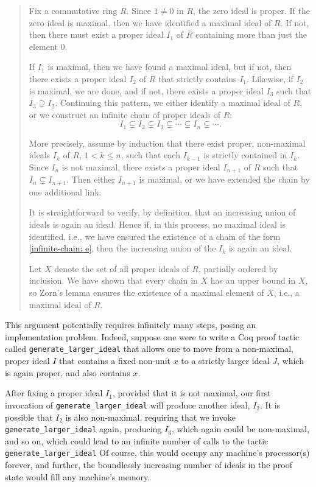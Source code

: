 \documentclass[referee,sn-mathphys]{sn-jnl}
\theoremstyle{definition}
\theoremstyle{remark}
\numberwithin{equation}{section}
\numberwithin{figure}{subsection}
\begin{document}
\begin{quote}
Fix a commutative ring $R$.  Since $1 \neq 0$ in $R$, the zero ideal is proper.  
If the zero ideal is maximal, then we have identified a maximal ideal of $R$. 
If not, then there must exist a proper ideal 
$I_1$ of $R$ containing more than just the element $0$. 

If $I_1$ is maximal, then we have found a maximal ideal, but if not, then there exists a proper ideal 
$I_2$ of $R$ that strictly contains $I_1$.  
Likewise, if $I_2$ is maximal, we are done, and if not, there exists a proper ideal $I_3$ such that $I_3 \supsetneq I_2$.
Continuing this pattern, we either identify a maximal ideal of $R$, or we construct an infinite chain of proper ideals of $R$:
    \begin{equation} \label{infinite-chain: e}
    I_{1}\subsetneq I_{2}\subsetneq I_{3}\subsetneq\cdots\subsetneq I_n \subsetneq \cdots. 
    \end{equation}  
    
       More precisely, assume by induction that  there exist proper, non-maximal ideals 
   $I_k$ of $R$, $1 < k \leq n$, such that each $I_{k-1}$ is strictly contained in $I_k$.  
   Since $I_n$ is not maximal, there exists a proper ideal $I_{n+1}$ of $R$ such that $I_n \subsetneq I_{n+1}$.
      Then either $I_{n+1}$ is maximal, or we have extended the chain by one additional link. 

It is straightforward to verify, by definition, 
         that an increasing union of ideals 
    is again an ideal.
Hence if, in this process, no maximal ideal is identified, i.e., we have ensured the existence of a chain of the form \eqref{infinite-chain: e},  then the increasing union of the $I_k$ is again an ideal.
   
Let $X$ denote the set of all proper ideals of $R$, partially ordered by inclusion.
We have shown that every chain in $X$ has an upper bound in $X$, so  Zorn's lemma ensures the existence of a maximal element of $X$, i.e., a maximal ideal of \(R\). 
\end{quote}

This argument potentially requires infinitely many steps, posing an implementation
 problem. Indeed, suppose one were to write a Coq proof tactic called \texttt{generate_larger_ideal}
 that allows one to move from a non-maximal, proper ideal \(I\) that contains a fixed non-unit 
$x$ to a strictly larger ideal 
\(J \), which is again proper, and also contains \(x\). 

After fixing a proper ideal $I_1$, provided that it is not maximal, 
our first invocation of \texttt{generate_larger_ideal}
will produce another ideal, \(I_{2}\). It is possible that \(I_{2}\) is also non-maximal, 
requiring that we invoke \texttt{generate_larger_ideal}
again, producing $I_3$, which again could be non-maximal, and so on, 
which could lead to an infinite number of calls to the tactic
\texttt{generate_larger_ideal}
Of course, this would occupy any machine's
processor(s) forever, and further, the boundlessly increasing number of ideals in the proof
state would fill any machine's memory. 
\end{document}
